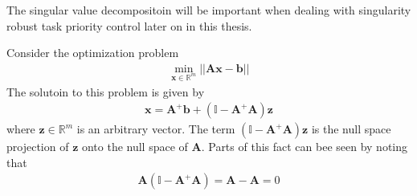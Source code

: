 The singular value
decompositoin will be important when dealing with singularity robust task priority
control later on in this thesis.

Consider the optimization problem
\begin{align}
    \min_{\bm{x} \in \mathbb{R}^m} || \bm{A} \bm{x} - \bm{b} ||
\end{align}
The solutoin to this problem is given by
\begin{align}
    \bm{x} = \bm{A}^{+} \bm{b} + (\mathbb{I} - \bm{A}^{+} \bm{A}) \bm{z}
\end{align}
where $\bm{z} \in \mathbb{R}^m$ is an arbitrary vector. The term $(\mathbb{I} - \bm{A}^{+} \bm{A}) \bm{z}$
is the null space projection of $\bm{z}$ onto the null space of $\bm{A}$. Parts
of this fact can bee seen by noting that
\begin{align}
    \bm{A}\left(\mathbb{I} - \bm{A}^{+} \bm{A}\right) = \bm{A} - \bm{A} = 0
\end{align}
